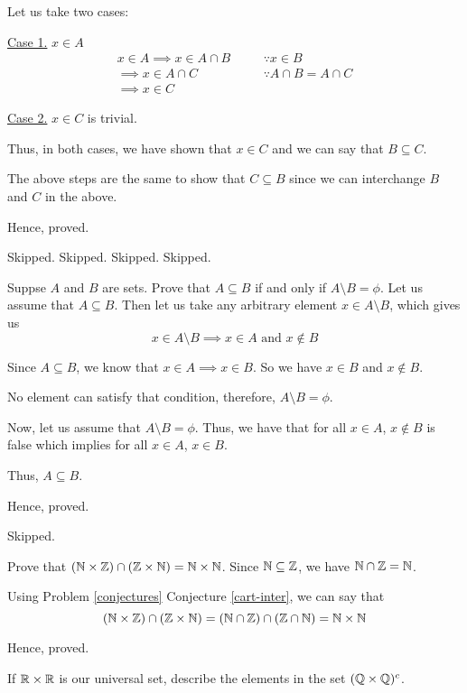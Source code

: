 Let us take two cases:

\underline{Case 1.} $x \in A$
\begin{align*}
	x \in A \implies x \in A \cap B &  & \quad \because x \in B             \\
	\implies x \in A \cap C         &  & \quad \because A \cap B = A \cap C \\
	\implies x \in C
\end{align*}

\underline{Case 2.} $x \in C$ is trivial.
\bigbreak

Thus, in both cases, we have shown that $x \in C$ and we can say that $B \subseteq C$.

The above steps are the same to show that $C \subseteq B$ since we can interchange $B$ and $C$ in the above.

Hence, proved.
\es

\bp Skipped. \ep
\bp Skipped. \ep
\bp Skipped. \ep
\bp Skipped. \ep

\bp Suppse $A$ and $B$ are sets. Prove that $A \subseteq B$ if and only if $A \setminus B = \phi$. \ep
\bs
Let us assume that $A \subseteq B$. Then let us take any arbitrary element $x \in A \setminus B$, which gives us
$$x \in A \setminus B \implies x \in A \text{ and } x \not\in B$$

Since $A \subseteq B$, we know that $x \in A \implies x \in B$. So we have $x \in B$ and $x \not\in B$.

No element can satisfy that condition, therefore, $A \setminus B = \phi$.

Now, let us assume that $A \setminus B = \phi$. Thus, we have that for all $x \in A$, $x \not\in B$ is false which implies for all $x \in A$, $x \in B$.

Thus, $A \subseteq B$.

Hence, proved.
\es

\bp Skipped. \ep

\bp Prove that $(\mathbb{N} \times \mathbb{Z}) \cap (\mathbb{Z} \times \mathbb{N}) = \mathbb{N} \times \mathbb{N}$. \ep
\bs
Since $\mathbb{N} \subseteq \mathbb{Z}$, we have $\mathbb{N} \cap \mathbb{Z} = \mathbb{N}$.

Using Problem \ref{conjectures} Conjecture \ref{cart-inter}, we can say that
$$(\mathbb{N} \times \mathbb{Z}) \cap (\mathbb{Z} \times \mathbb{N})
	= (\mathbb{N} \cap \mathbb{Z}) \cap (\mathbb{Z} \cap \mathbb{N})
	= \mathbb{N} \times \mathbb{N}$$

Hence, proved.
\es

\bp If $\mathbb{R} \times \mathbb{R}$ is our universal set, describe the elements in the set $( \mathbb{Q} \times \mathbb{Q})^c$. \ep

